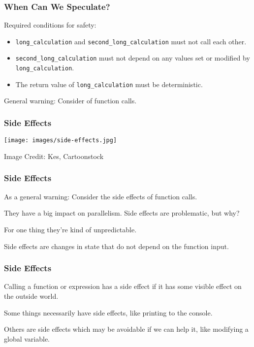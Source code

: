 \begin{frame}
  \frametitle{When Can We Speculate?}

  
  Required conditions for safety:

  \begin{itemize}
    \item {\tt long\_calculation} and {\tt second\_long\_calculation} must not call
      each other.
    \item {\tt second\_long\_calculation} must not depend on
      any values set or modified by {\tt long\_calculation}.
    \item The return value of {\tt long\_calculation} must be deterministic.
  \end{itemize}

  General warning: Consider  of function calls.
  
\end{frame}



\begin{frame}
\frametitle{Side Effects}

\begin{center}
	\texttt{[image: images/side-effects.jpg]}
\end{center}
\hfill Image Credit: Kes, Cartoonstock


\end{frame}


\begin{frame}
\frametitle{Side Effects}

As a general warning: Consider the \alert{side effects} of function calls. 

They have a big impact on parallelism. Side effects are problematic, but why? 

For one thing they're kind of unpredictable. 

Side effects are changes in state that do not depend on the function input. 

\end{frame}


\begin{frame}
\frametitle{Side Effects}

Calling a function or expression has a side effect if it has some visible effect on the outside world. 

Some things necessarily have side effects, like printing to the console. 

Others are side effects which may be avoidable if we can help it, like modifying a global variable.

\end{frame}




